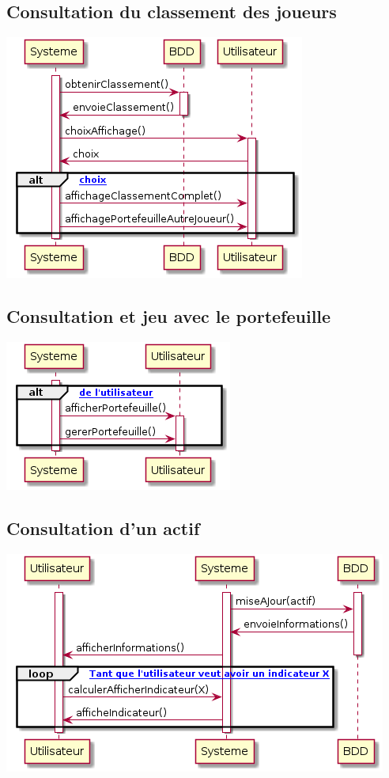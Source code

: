 \subsection{Consultation du classement des joueurs}
\includegraphics[scale=0.5]{../graph/DiagrammeSequenceConsulterClassement.png} \\

\subsection{Consultation et jeu avec le portefeuille}
\includegraphics[scale=0.5]{../graph/DiagrammeSequenceConsulterGererPortefeuille.png} \\

\subsection{Consultation d'un actif}
\includegraphics[scale=0.5]{../graph/DiagrammeSequenceConsulterActif.png} \\

